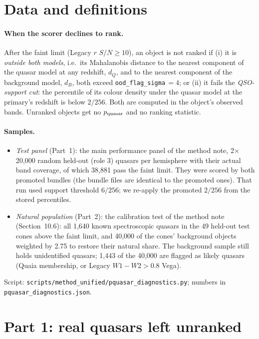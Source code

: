 \documentclass[11pt,a4paper]{article}
\newcommand{\code}[1]{\texttt{#1}}
\newcommand{\pq}{p_{\rm quasar}}
\begin{document}
\section{Data and definitions}
\paragraph{When the scorer declines to rank.} After the faint limit (Legacy $r$ $S/N\ge10$), an object is not
ranked if (i) it is \emph{outside both models}, i.e.\ its Mahalanobis distance to the nearest component of the
quasar model at any redshift, $d_Q$, and to the nearest component of the background model, $d_B$, both exceed
\code{ood\_flag\_sigma}$\,=4$; or (ii) it fails the \emph{QSO-support cut}: the percentile of its colour density
under the quasar model at the primary's redshift is below $2/256$. Both are computed in the object's observed
bands. Unranked objects get no $\pq$ and no ranking statistic.

\paragraph{Samples.}
\begin{itemize}
\item \emph{Test panel} (Part~1): the main performance panel of the method note, 2$\times$20,000 random held-out
  (role 3) quasars per hemisphere with their actual band coverage, of which 38,881 pass the faint limit. They
  were scored by both promoted bundles (the bundle files are identical to the promoted ones). That run used
  support threshold $6/256$; we re-apply the promoted $2/256$ from the stored percentiles.
\item \emph{Natural population} (Part~2): the calibration test of the method note (Section~10.6): all 1,640
  known spectroscopic quasars in the 49 held-out test cones above the faint limit, and 40,000 of the cones'
  background objects weighted by 2.75 to restore their natural share. The background sample still holds
  unidentified quasars; 1,443 of the 40,000 are flagged as likely quasars (Quaia membership, or Legacy
  $W1-W2>0.8$ Vega).
\end{itemize}
Script: \code{scripts/method\_unified/pquasar\_diagnostics.py}; numbers in \code{pquasar\_diagnostics.json}.

\section{Part 1: real quasars left unranked}
\end{document}
